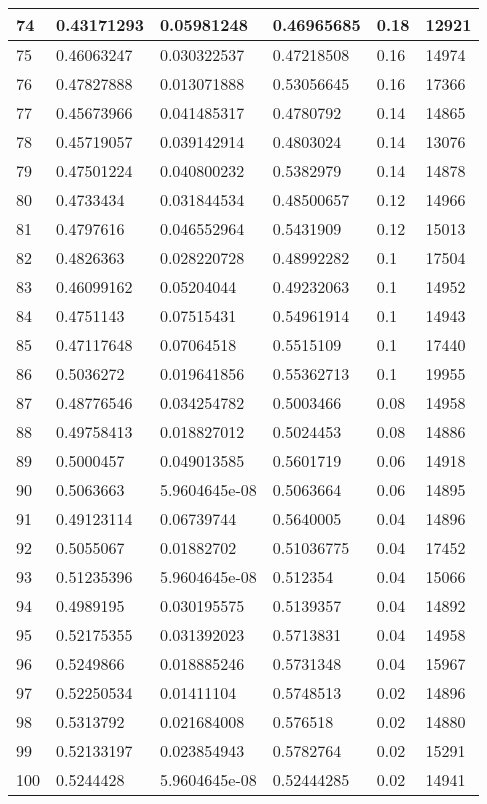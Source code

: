 \begin{longtable}{|l|l|l|l|l|l|}
74 & 0.43171293 & 0.05981248 & 0.46965685 & 0.18 & 12921 \\ \hline 
75 & 0.46063247 & 0.030322537 & 0.47218508 & 0.16 & 14974 \\ \hline 
76 & 0.47827888 & 0.013071888 & 0.53056645 & 0.16 & 17366 \\ \hline 
77 & 0.45673966 & 0.041485317 & 0.4780792 & 0.14 & 14865 \\ \hline 
78 & 0.45719057 & 0.039142914 & 0.4803024 & 0.14 & 13076 \\ \hline 
79 & 0.47501224 & 0.040800232 & 0.5382979 & 0.14 & 14878 \\ \hline 
80 & 0.4733434 & 0.031844534 & 0.48500657 & 0.12 & 14966 \\ \hline 
81 & 0.4797616 & 0.046552964 & 0.5431909 & 0.12 & 15013 \\ \hline 
82 & 0.4826363 & 0.028220728 & 0.48992282 & 0.1 & 17504 \\ \hline 
83 & 0.46099162 & 0.05204044 & 0.49232063 & 0.1 & 14952 \\ \hline 
84 & 0.4751143 & 0.07515431 & 0.54961914 & 0.1 & 14943 \\ \hline 
85 & 0.47117648 & 0.07064518 & 0.5515109 & 0.1 & 17440 \\ \hline 
86 & 0.5036272 & 0.019641856 & 0.55362713 & 0.1 & 19955 \\ \hline 
87 & 0.48776546 & 0.034254782 & 0.5003466 & 0.08 & 14958 \\ \hline 
88 & 0.49758413 & 0.018827012 & 0.5024453 & 0.08 & 14886 \\ \hline 
89 & 0.5000457 & 0.049013585 & 0.5601719 & 0.06 & 14918 \\ \hline 
90 & 0.5063663 & 5.9604645e-08 & 0.5063664 & 0.06 & 14895 \\ \hline 
91 & 0.49123114 & 0.06739744 & 0.5640005 & 0.04 & 14896 \\ \hline 
92 & 0.5055067 & 0.01882702 & 0.51036775 & 0.04 & 17452 \\ \hline 
93 & 0.51235396 & 5.9604645e-08 & 0.512354 & 0.04 & 15066 \\ \hline 
94 & 0.4989195 & 0.030195575 & 0.5139357 & 0.04 & 14892 \\ \hline 
95 & 0.52175355 & 0.031392023 & 0.5713831 & 0.04 & 14958 \\ \hline 
96 & 0.5249866 & 0.018885246 & 0.5731348 & 0.04 & 15967 \\ \hline 
97 & 0.52250534 & 0.01411104 & 0.5748513 & 0.02 & 14896 \\ \hline 
98 & 0.5313792 & 0.021684008 & 0.576518 & 0.02 & 14880 \\ \hline 
99 & 0.52133197 & 0.023854943 & 0.5782764 & 0.02 & 15291 \\ \hline 
100 & 0.5244428 & 5.9604645e-08 & 0.52444285 & 0.02 & 14941 \\ \hline 
\end{longtable}